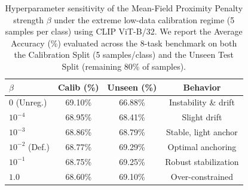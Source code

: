 \begin{table}[h]
\caption{Hyperparameter sensitivity of the Mean-Field Proximity Penalty strength $\beta$ under the extreme low-data calibration regime (5 samples per class) using CLIP ViT-B/32. We report the Average Accuracy (\%) evaluated across the 8-task benchmark on both the Calibration Split (5 samples/class) and the Unseen Test Split (remaining 80\% of samples).}
\label{tab:beta_sensitivity}
\vskip 0.15in
\begin{center}
\begin{small}
\begin{sc}
\setlength{\tabcolsep}{2pt}
\begin{tabular}{lccc}
\toprule
$\beta$ & Calib (\%) & Unseen (\%) & Behavior \\
\midrule
$0$ (Unreg.) & 69.10\% & 66.88\% & Instability \& drift \\
$10^{-4}$ & 68.95\% & 68.41\% & Slight drift \\
$10^{-3}$ & 68.86\% & 68.79\% & Stable, light anchor \\
$10^{-2}$ (Def.) & 68.77\% & 69.29\% & Optimal anchoring \\
$10^{-1}$ & 68.75\% & 69.25\% & Robust stabilization \\
$1.0$ & 68.60\% & 69.10\% & Over-constrained \\
\bottomrule
\end{tabular}
\end{sc}
\end{small}
\end{center}
\vskip -0.1in
\end{table}

